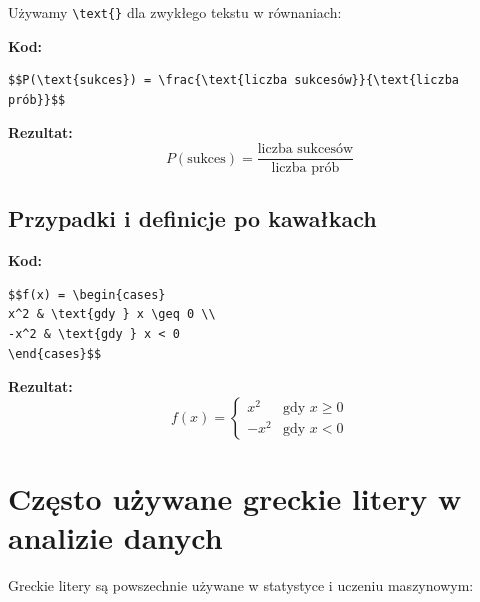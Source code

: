 \documentclass[
  polish,
  letterpaper,
  DIV=11,
  numbers=noendperiod]{scrreprt}
\begin{document}
Używamy \texttt{\textbackslash{}text\{\}} dla zwykłego tekstu w
równaniach:

\textbf{Kod:}

\begin{verbatim}
$$P(\text{sukces}) = \frac{\text{liczba sukcesów}}{\text{liczba prób}}$$
\end{verbatim}

\textbf{Rezultat:}
\[P(\text{sukces}) = \frac{\text{liczba sukcesów}}{\text{liczba prób}}\]

\subsection{Przypadki i definicje po
kawałkach}\label{przypadki-i-definicje-po-kawaux142kach}

\textbf{Kod:}

\begin{verbatim}
$$f(x) = \begin{cases}
x^2 & \text{gdy } x \geq 0 \\
-x^2 & \text{gdy } x < 0
\end{cases}$$
\end{verbatim}

\textbf{Rezultat:} \[f(x) = \begin{cases}
x^2 & \text{gdy } x \geq 0 \\
-x^2 & \text{gdy } x < 0
\end{cases}\]

\section{Często używane greckie litery w analizie
danych}\label{czux119sto-uux17cywane-greckie-litery-w-analizie-danych}

Greckie litery są powszechnie używane w statystyce i uczeniu maszynowym:
\end{document}
